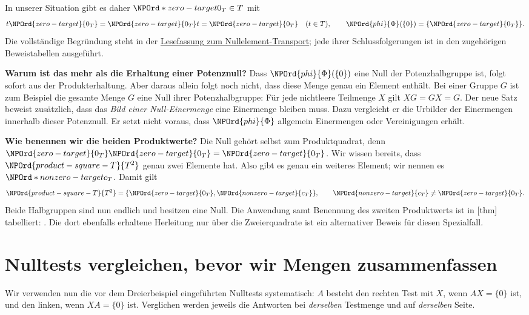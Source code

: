 In unserer Situation gibt es daher \(\NPOrd*{zero-target}{0_T}\in T\) mit
\[
 t\NPOrd{zero-target}{0_T}=\NPOrd{zero-target}{0_T}t=\NPOrd{zero-target}{0_T}
 \quad(t\in T),\qquad
 \NPOrd{phi}{\Phi}(\{0\})=\{\NPOrd{zero-target}{0_T}\}.
\]
Die vollständige Begründung steht in der
\href{../zero-transport/_B28-zero-transport-reading.pdf\#zero-transport.reading}%
{Lesefassung zum Nullelement-Transport}; jede ihrer Schlussfolgerungen
ist in den zugehörigen Beweistabellen ausgeführt.

\medskip\noindent\textbf{Warum ist das mehr als die Erhaltung einer Potenznull?}
Dass \(\NPOrd{phi}{\Phi}(\{0\})\) eine Null der Potenzhalbgruppe ist,
folgt sofort aus der Produkterhaltung. Aber daraus allein folgt noch
nicht, dass diese Menge genau ein Element enthält. Bei einer Gruppe
\(G\) ist zum Beispiel die gesamte Menge \(G\) eine Null ihrer
Potenzhalbgruppe: Für jede nichtleere Teilmenge \(X\) gilt \(XG=GX=G\).
Der neue Satz beweist zusätzlich, dass das \emph{Bild einer Null-Einermenge}
eine Einermenge bleiben muss. Dazu vergleicht er die Urbilder der
Einermengen innerhalb dieser Potenznull. Er setzt nicht voraus, dass
\(\NPOrd{phi}{\Phi}\) allgemein Einermengen oder Vereinigungen erhält.

\medskip\noindent\textbf{Wie benennen wir die beiden Produktwerte?}
Die Null gehört selbst zum Produktquadrat, denn
\(\NPOrd{zero-target}{0_T}\NPOrd{zero-target}{0_T}=\NPOrd{zero-target}{0_T}\).
Wir wissen bereits, dass \(\NPOrd{product-square-T}{T^2}\) genau zwei Elemente hat.
Also gibt es genau ein weiteres Element; wir nennen es
\(\NPOrd*{nonzero-target}{c_T}\). Damit gilt
\[
 \NPOrd{product-square-T}{T^2}
 =\{\NPOrd{zero-target}{0_T},\NPOrd{nonzero-target}{c_T}\},\qquad
 \NPOrd{nonzero-target}{c_T}\ne\NPOrd{zero-target}{0_T}.
\]
Beide Halbgruppen sind nun endlich und besitzen eine Null.
Die Anwendung samt Benennung des zweiten Produktwerts ist in
[thm] tabelliert:
.
Die dort ebenfalls erhaltene Herleitung nur über die Zweierquadrate
ist ein alternativer Beweis für diesen Spezialfall.

\section*{Nulltests vergleichen, bevor wir Mengen zusammenfassen}

Wir verwenden nun die vor dem Dreierbeispiel eingeführten Nulltests
systematisch: \(A\) besteht den rechten Test mit \(X\), wenn
\(AX=\{0\}\) ist, und den linken, wenn \(XA=\{0\}\) ist.
Verglichen werden jeweils die Antworten bei \emph{derselben}
Testmenge und auf \emph{derselben} Seite.

